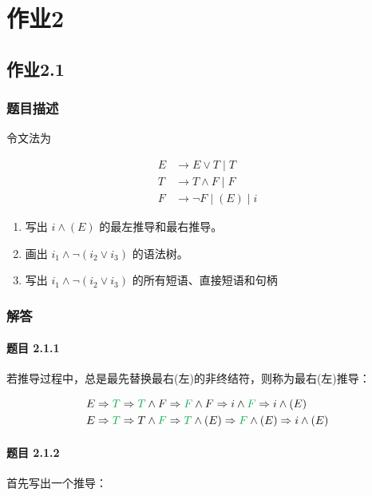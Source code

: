 \section{作业2}
\subsection{作业2.1}
\subsubsection{题目描述}

令文法为

\begin{align*}
E &\rightarrow E \vee T\;|\;T\\
T &\rightarrow T \wedge F\;|\; F\\
F &\rightarrow \neg F\;|\;(E)\;|\; i
\end{align*}

\begin{enumerate}
    \item 写出 $i \wedge(E)$  的最左推导和最右推导。
    \item 画出 $i_{1} \wedge \neg\left(i_{2} \vee i_{3}\right)$ 的语法树。
    \item 写出 $i_{1} \wedge \neg\left(i_{2} \vee i_{3}\right)$ 的所有短语、直接短语和句柄
\end{enumerate}

\subsubsection{解答}

\paragraph{题目 2.1.1} 若推导过程中，总是最先替换最右(左)的非终结符，则称为最右(左)推导：

\begin{align*}
E & \Rightarrow {\color{Green} T} \Rightarrow {\color{Green} T} \wedge F \Rightarrow {\color{Green} F}  \wedge F  \Rightarrow i \wedge {\color{Green} F}  \Rightarrow i \wedge (E) \\
E & \Rightarrow {\color{Green} T} \Rightarrow T \wedge {\color{Green} F} \Rightarrow {\color{Green} T}  \wedge (E) \Rightarrow {\color{Green} F}   \wedge (E) \Rightarrow i \wedge (E)
\end{align*}

\paragraph{题目 2.1.2} 首先写出一个推导：

